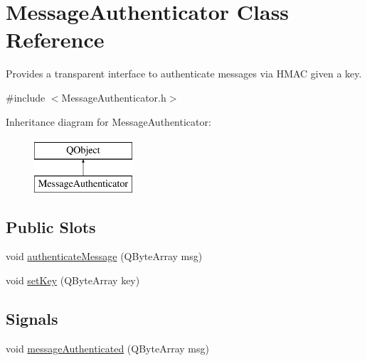\hypertarget{class_message_authenticator}{}\section{Message\+Authenticator Class Reference}
\label{class_message_authenticator}


Provides a transparent interface to authenticate messages via H\+M\+A\+C given a key.  




{\ttfamily \#include $<$Message\+Authenticator.\+h$>$}

Inheritance diagram for Message\+Authenticator\+:\begin{figure}[H]
\begin{center}
\leavevmode
\includegraphics[height=2.000000cm]{class_message_authenticator}
\end{center}
\end{figure}
\subsection*{Public Slots}
\begin{DoxyCompactItemize}
\item 
void \hyperlink{class_message_authenticator_a78f02c0b2b0a11c5c906661a3a9673a7}{authenticate\+Message} (Q\+Byte\+Array msg)
\item 
void \hyperlink{class_message_authenticator_a314015218155da216f59784ab665bd3f}{set\+Key} (Q\+Byte\+Array key)
\end{DoxyCompactItemize}
\subsection*{Signals}
\begin{DoxyCompactItemize}
\item 
void \hyperlink{class_message_authenticator_ab42eef9013d87c23c21e4d3033ff38aa}{message\+Authenticated} (Q\+Byte\+Array msg)
\end{DoxyCompactItemize}

